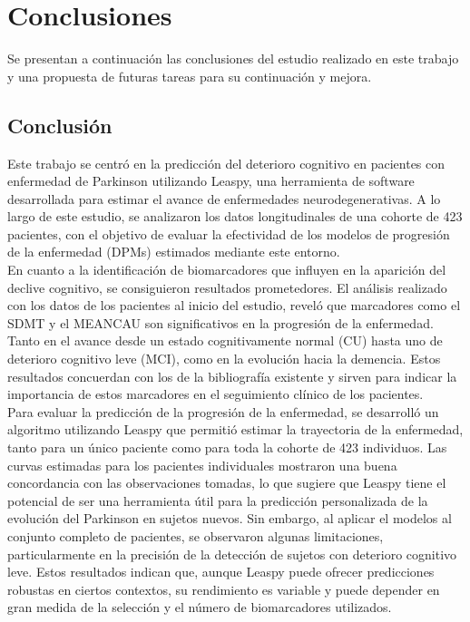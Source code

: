 \chapter{Conclusiones}

Se presentan a continuación las conclusiones del estudio realizado en este trabajo y una propuesta de futuras tareas para su continuación y mejora. 


\section{Conclusión}

Este trabajo se centró en la predicción del deterioro cognitivo en pacientes con enfermedad de Parkinson utilizando Leaspy, una herramienta de software desarrollada para estimar el avance de enfermedades neurodegenerativas. A lo largo de este estudio, se analizaron los datos longitudinales de una cohorte de 423 pacientes, con el objetivo de evaluar la efectividad de los modelos de progresión de la enfermedad (DPMs) estimados mediante este entorno.\\

En cuanto a la identificación de biomarcadores que influyen en la aparición del declive cognitivo, se consiguieron resultados prometedores. El análisis realizado con los datos de los pacientes al inicio del estudio, reveló que marcadores como el SDMT y el MEANCAU son significativos en la progresión de la enfermedad. Tanto en el avance desde un estado cognitivamente normal (CU) hasta uno de deterioro cognitivo leve (MCI), como en la evolución hacia la demencia. Estos resultados concuerdan con los de la bibliografía existente y sirven para indicar la importancia de estos marcadores en el seguimiento clínico de los pacientes.\\

Para evaluar la predicción de la progresión de la enfermedad, se desarrolló un algoritmo utilizando Leaspy que permitió estimar la trayectoria de la enfermedad, tanto para un único paciente como para toda la cohorte de 423 individuos. Las curvas estimadas para los pacientes individuales mostraron una buena concordancia con las observaciones tomadas, lo que sugiere que Leaspy tiene el potencial de ser una herramienta útil para la predicción personalizada de la evolución del Parkinson en sujetos nuevos. Sin embargo, al aplicar el modelos al conjunto completo de pacientes, se observaron algunas limitaciones, particularmente en la precisión de la detección de sujetos con deterioro cognitivo leve. Estos resultados indican que, aunque Leaspy puede ofrecer predicciones robustas en ciertos contextos, su rendimiento es variable y puede depender en gran medida de la selección y el número de biomarcadores utilizados.\\

